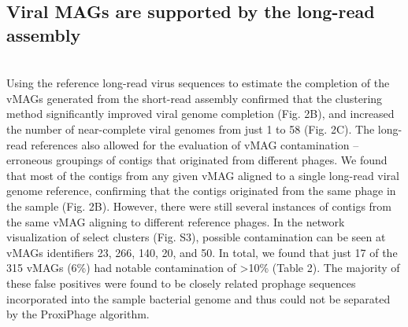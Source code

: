 \subsection*{Viral MAGs are supported by the long-read assembly} \hfill\\
Using the reference long-read virus sequences to estimate the completion of the vMAGs generated from the short-read assembly confirmed that the clustering method significantly improved viral genome completion (Fig. 2B), and increased the number of near-complete viral genomes from just 1 to 58 (Fig. 2C). The long-read references also allowed for the evaluation of vMAG contamination – erroneous groupings of contigs that originated from different phages. We found that most of the contigs from any given vMAG aligned to a single long-read viral genome reference, confirming that the contigs originated from the same phage in the sample (Fig. 2B). However, there were still several instances of contigs from the same vMAG aligning to different reference phages. In the network visualization of select clusters (Fig. S3), possible contamination can be seen at vMAGs identifiers 23, 266, 140, 20, and 50. In total, we found that just 17 of the 315 vMAGs (6\%) had notable contamination of >10\% (Table 2). The majority of these false positives were found to be closely related prophage sequences incorporated into the sample bacterial genome and thus could not be separated by the ProxiPhage algorithm. 


